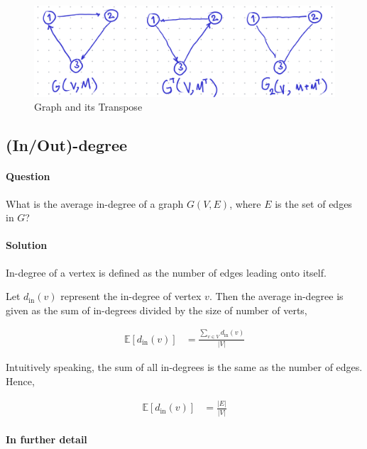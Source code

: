 \documentclass[11pt]{article}
\begin{document}
\begin{figure}[htbp]
\centering
\includegraphics[width=.9\linewidth]{images/transpose-graphs.png}
\caption{\label{fig:transposeGraph}Graph and its Transpose}
\end{figure}


\subsection{(In/Out)-degree}
\label{sec:org4c57af4}

\paragraph*{Question}
\label{sec:org930561b}
What is the average in-degree of a graph \(G(V,E)\),
where \(E\) is the set of edges in \(G\)?

\paragraph*{Solution}
\label{sec:org8daa2e0}
In-degree of a vertex is defined as the number of
edges leading onto itself.

Let \(d_{\mathrm{in}}(v)\) represent the in-degree of
vertex \(v\).  Then the average in-degree is given as the
sum of in-degrees divided by the size of number of
verts,

\begin{align*}
  \mathbb{E}[d_{\mathrm{in}}(v)]
  &= \frac{\sum_{v\in V}d_{\mathrm{in}}(v)} {|V|}
\end{align*}

Intuitively speaking, the sum of all in-degrees is the
same as the number of edges. Hence,

\begin{align*}
  \mathbb{E}[d_{\mathrm{in}}(v)]
  &= \frac{|E|} {|V|}
\end{align*}

\paragraph*{In further detail}
\label{sec:org94bddb6}
\end{document}
